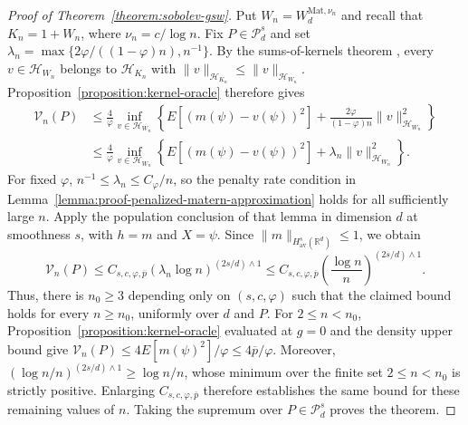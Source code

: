 \documentclass[letterpaper,12pt]{article}
\theoremstyle{definition}
\numberwithin{equation}{section}
\newcommand{\mc}{\mathcal}
\newcommand{\norm}[1]{\lVert#1\rVert}
\begin{document}
\begin{proof}[Proof of Theorem~\ref{theorem:sobolev-gsw}]
Put $W_n=W_d^{\mathrm{Mat},\nu_n}$ and recall that $K_n=1+W_n$, where $\nu_n=c/\log n$.
Fix $P\in\mc P_d^s$ and set $\lambda_n=\max\{2\varphi/((1-\varphi)n),n^{-1}\}$.
By the sums-of-kernels theorem \citep[Theorem~5.4]{paulsen2016rkhs}, every $v\in\mc H_{W_n}$ belongs to $\mc H_{K_n}$ with $\norm{v}_{\mc H_{K_n}}\leq\norm{v}_{\mc H_{W_n}}$.
Proposition~\ref{proposition:kernel-oracle} therefore gives
\begin{align*}
\mc V_n(P)&\leq\frac4\varphi\inf_{v\in\mc H_{W_n}}\left\{E[(m(\psi)-v(\psi))^2]+\frac{2\varphi}{(1-\varphi)n}\norm{v}_{\mc H_{W_n}}^2\right\}\\
&\leq\frac4\varphi\inf_{v\in\mc H_{W_n}}\left\{E[(m(\psi)-v(\psi))^2]+\lambda_n\norm{v}_{\mc H_{W_n}}^2\right\}.
\end{align*}
For fixed $\varphi$, $n^{-1}\leq\lambda_n\leq C_\varphi/n$, so the penalty rate condition in Lemma~\ref{lemma:proof-penalized-matern-approximation} holds for all sufficiently large $n$.
Apply the population conclusion of that lemma in dimension $d$ at smoothness $s$, with $h=m$ and $X=\psi$.
Since $\norm{m}_{H_{\mathrm{av}}^s(\mathbb R^d)}\leq1$, we obtain
\begin{equation*}
\mc V_n(P)\leq C_{s,c,\varphi,\overline p}(\lambda_n\log n)^{(2s/d)\wedge1}\leq C_{s,c,\varphi,\overline p}\left(\frac{\log n}{n}\right)^{(2s/d)\wedge1}.
\end{equation*}
Thus, there is $n_0\geq3$ depending only on $(s,c,\varphi)$ such that the claimed bound holds for every $n\geq n_0$, uniformly over $d$ and $P$.
For $2\leq n<n_0$, Proposition~\ref{proposition:kernel-oracle} evaluated at $g=0$ and the density upper bound give $\mc V_n(P)\leq4E[m(\psi)^2]/\varphi\leq4\overline p/\varphi$.
Moreover, $(\log n/n)^{(2s/d)\wedge1}\geq\log n/n$, whose minimum over the finite set $2\leq n<n_0$ is strictly positive.
Enlarging $C_{s,c,\varphi,\overline p}$ therefore establishes the same bound for these remaining values of $n$.
Taking the supremum over $P\in\mc P_d^s$ proves the theorem.
\end{proof}
\end{document}
